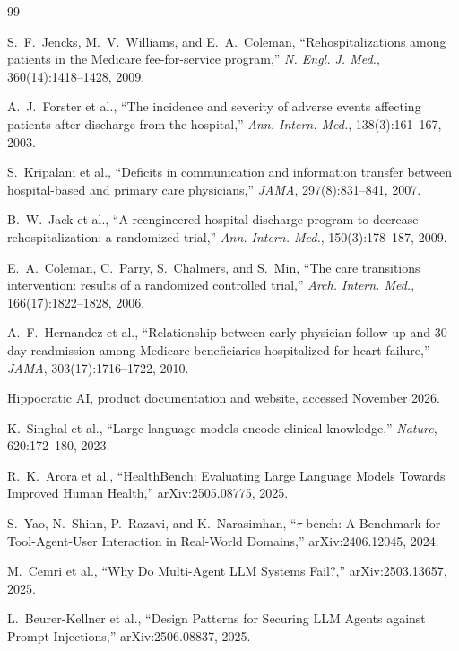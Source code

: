 \documentclass[11pt,a4paper]{article}
\begin{document}
\begingroup
\footnotesize
\setlength{\parskip}{0pt}
\begin{thebibliography}{99}
\setlength{\itemsep}{1pt}
\setlength{\parsep}{0pt}

 S.~F.~Jencks, M.~V.~Williams, and E.~A.~Coleman, ``Rehospitalizations among patients in the Medicare fee-for-service program,'' \emph{N. Engl. J. Med.}, 360(14):1418--1428, 2009.

 A.~J.~Forster et al., ``The incidence and severity of adverse events affecting patients after discharge from the hospital,'' \emph{Ann. Intern. Med.}, 138(3):161--167, 2003.

 S.~Kripalani et al., ``Deficits in communication and information transfer between hospital-based and primary care physicians,'' \emph{JAMA}, 297(8):831--841, 2007.

 B.~W.~Jack et al., ``A reengineered hospital discharge program to decrease rehospitalization: a randomized trial,'' \emph{Ann. Intern. Med.}, 150(3):178--187, 2009.

 E.~A.~Coleman, C.~Parry, S.~Chalmers, and S.~Min, ``The care transitions intervention: results of a randomized controlled trial,'' \emph{Arch. Intern. Med.}, 166(17):1822--1828, 2006.

 A.~F.~Hernandez et al., ``Relationship between early physician follow-up and 30-day readmission among Medicare beneficiaries hospitalized for heart failure,'' \emph{JAMA}, 303(17):1716--1722, 2010.

 Hippocratic AI, product documentation and website, accessed November 2026.

 K.~Singhal et al., ``Large language models encode clinical knowledge,'' \emph{Nature}, 620:172--180, 2023.

 R.~K.~Arora et al., ``HealthBench: Evaluating Large Language Models Towards Improved Human Health,'' arXiv:2505.08775, 2025.

 S.~Yao, N.~Shinn, P.~Razavi, and K.~Narasimhan, ``$\tau$-bench: A Benchmark for Tool-Agent-User Interaction in Real-World Domains,'' arXiv:2406.12045, 2024.

 M.~Cemri et al., ``Why Do Multi-Agent LLM Systems Fail?,'' arXiv:2503.13657, 2025.

 L.~Beurer-Kellner et al., ``Design Patterns for Securing LLM Agents against Prompt Injections,'' arXiv:2506.08837, 2025.


\end{thebibliography}
\end{document}
